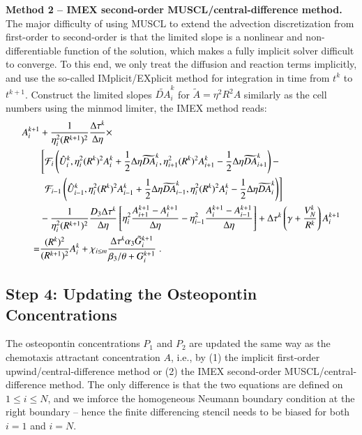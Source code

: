 \documentclass{amsart}
\theoremstyle{definition}
\theoremstyle{remark}
\numberwithin{equation}{section}
\numberwithin{figure}{section}
\begin{document}
\noindent
{\bf Method 2 -- IMEX second-order MUSCL/central-difference method.}
The major difficulty of using MUSCL to extend the advection discretization from first-order to second-order is that the limited slope is a nonlinear and non-differentiable function of the solution, which makes a fully implicit solver difficult to converge.
To this end, we only treat the diffusion and reaction terms implicitly, and use the so-called IMplicit/EXplicit method for integration in time from $t^k$ to $t^{k+1}$.
Construct the limited slopes $\widetilde{DA}^k_i$ for $\tilde{A}=\eta^2R^2A$ similarly as the cell numbers using the minmod limiter, the IMEX method reads:
\begin{align}
\label{eq:num_imex_muscl_chem}
A_i^{k+1} &+ \frac{1}{\eta_i^2(R^{k+1})^2}\frac{\Delta\tau^k}{\Delta\eta}\times \\ 
\notag
&\left[\mathcal{F}_i\left(\hat{U}_i^k,\eta_i^2(R^k)^2A_i^k+\frac{1}{2}\Delta\eta\widetilde{DA}_i^k,\eta_{i+1}^2(R^k)^2A_{i+1}^k-\frac{1}{2}\Delta\eta\widetilde{DA}_{i+1}^k\right)-\right.\\
\notag
&\ \left.\mathcal{F}_{i-1}\left(\hat{U}_{i-1}^k,\eta_i^2(R^k)^2A_{i-1}^k+\frac{1}{2}\Delta\eta\widetilde{DA}^k_{i-1},\eta_i^2(R^k)^2A_i^k-\frac{1}{2}\Delta\eta\widetilde{DA}^k_i\right)\right] \\
\notag
&-\frac{1}{\eta_i^2(R^{k+1})^2}\frac{D_3\Delta\tau^k}{\Delta\eta}\left[\eta_i^2\frac{A_{i+1}^{k+1}-A_i^{k+1}}{\Delta\eta}-\eta_{i-1}^2\frac{A_i^{k+1}-A_{i-1}^{k+1}}{\Delta\eta}\right] + \Delta\tau^k\left(\gamma+\frac{V_N^k}{R^k}\right)A_i^{k+1} \\
\notag
= & \frac{(R^k)^2}{(R^{k+1})^2}A_i^k + \chi_{i\le m}\frac{\Delta\tau^k \alpha_3\tilde{G}_i^{k+1}}{\beta_3/\theta+G_i^{k+1}}\;.
\end{align}

\subsection{Step 4: Updating the Osteopontin Concentrations}
The osteopontin concentrations $P_1$ and $P_2$ are updated the same way as the chemotaxis attractant concentration $A$, i.e., by (1) the implicit first-order upwind/central-difference method or (2) the IMEX second-order MUSCL/central-difference method.
The only difference is that the two equations are defined on $1\le i\le N$, and we imforce the homogeneous Neumann boundary condition at the right boundary -- hence the finite differencing stencil needs to be biased for both $i=1$ and $i=N$.
\end{document}
